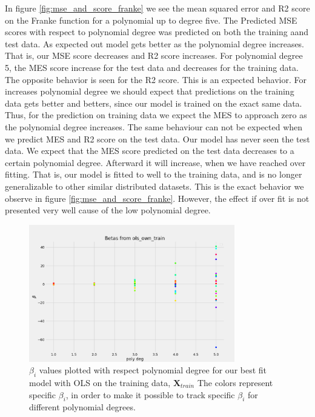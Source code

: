 In figure \ref{fig:mse_and_score_franke} we see the mean squared error and R2
score on the Franke function for a polynomial up to degree five. The Predicted
MSE scores with respect to polynomial degree was predicted on both the training
aand test data. As expected out model gets better as the polynomial degree
increases. That is, our MSE score decreases and R2 score increases. For
polynomial degree 5, the MES score increase for the test data and decreases for
the training data. The opposite behavior is seen for the R2 score. This is an
expected behavior. For increases polynomial degree we should expect that
predictions on the training data gets better and betters, since our model is
trained on the exact same data. Thus, for the prediction on training data we
expect the MES to approach zero as the polynomial degree increases. The same
behaviour can not be expected when we predict MES and R2 score on the test
data. Our model has never seen the test data. We expect that the MES score
predicted on the test data decreases to a certain polynomial degree. Afterward
it will increase, when we have reached over fitting. That is, our model is
fitted to well to the training data, and is no longer generalizable to other
similar distributed datasets. This is the exact behavior we observe in figure
\ref{fig:mse_and_score_franke}. However, the effect if over fit is not
presented very well cause of the low polynomial degree. 




\begin{figure}[H]
    \centering
    \includegraphics[width=0.8\textwidth]{Figures/b_beta.png}
    \caption{ $\beta _i$ values plotted with respect polynomial degree for our best
    fit model with OLS on the training data, $\bm{X} _{train} $ 
    The colors represent specific $\beta _i$, in order to make it possible to
    track specific $\beta _i$ for different polynomial degrees.      }
    \label{fig:beta_plot}
\end{figure}

